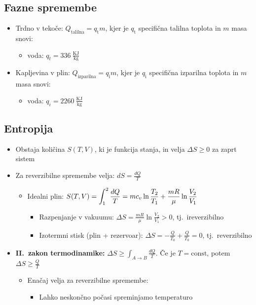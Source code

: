 \subsection{Fazne spremembe}
\begin{itemize}
    \item Trdno v tekoče: \(Q_\text{talilna} = q_\text{t}m\), kjer je \(q_\text{t}\) specifična talilna toplota in \(m\) masa snovi:
    \begin{itemize}
        \item voda: \(q_t = 336 \ \frac{\text{KJ}}{\text{kg}}\)
    \end{itemize}
    \item Kapljevina v plin: \(Q_\text{izparilna} = q_\text{i}m\), kjer je \(q_\text{i}\) specifična izparilna toplota in \(m\) masa snovi:
    \begin{itemize}
        \item voda: \(q_i = 2260 \ \frac{\text{KJ}}{\text{kg}}\)
    \end{itemize}
\end{itemize}

\subsection{Entropija}
\begin{itemize}
    \item Obstaja količina \(S(T, V)\), ki je funkcija stanja, in velja 
    \(\Delta S \geq 0\)
    za zaprt sistem
    \item Za reverzibilne spremembe velja: \(dS = \frac{dQ}{T}\)
    \begin{itemize}
        \item Idealni plin: \(\displaystyle S(T, V) = \int_{1}^{2} \frac{dQ}{T} = mc_v \ln \frac{T_2}{T_1} + \frac{mR}{\mu} \ln \frac{V_2}{V_1}\)
        \begin{itemize}
            \item Razpenjanje v vakuumu: \(\Delta S = \frac{mR}{\mu} \ln \frac{V_2}{V_1} > 0\), tj.\ ireverzibilno
            \item Izotermni stisk (plin + rezervoar): \(\Delta S = -\frac{Q}{T_0} + \frac{Q}{T_0} = 0\), tj.\ reverzibilno
        \end{itemize}
    \end{itemize}
    \item \textbf{II.\ zakon termodinamike:} \(\Delta S \geq \int_{A \to B} \frac{dQ}{T}\). Če je \(T = \text{const}\), potem \(\Delta S \geq \frac{Q}{T}\)
    \begin{itemize}
        \item Enačaj velja za reverzibilne spremembe:
        \begin{itemize}
            \item Lahko neskončno počasi spreminjamo temperaturo
        \end{itemize}
    \end{itemize}
\end{itemize}

